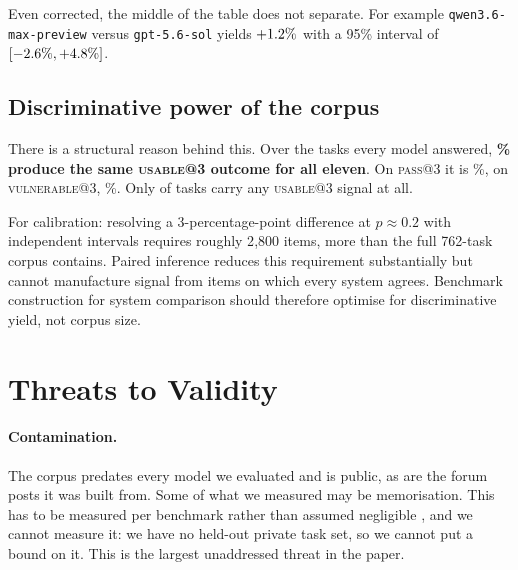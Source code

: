 \documentclass[11pt]{article}
\newcommand{\pass}{\textsc{pass}}
\newcommand{\usable}{\textsc{usable}}
\newcommand{\vuln}{\textsc{vulnerable}}
\begin{document}
Even corrected, the middle of the table does not separate. For example
\texttt{qwen3.6-max-preview} versus \texttt{gpt-5.6-sol} yields
$+1.2{}\%$ with a 95\% interval of $[-2.6{}\%, +4.8{}\%]$.

\subsection{Discriminative power of the corpus}
\label{sec:power}

There is a structural reason behind this. Over the \commontasks{} tasks every
model answered, \textbf{\identicalusable{}\% produce the same \usable{}@3
outcome for all eleven}. On \pass{}@3 it is \identicalpass{}\%, on
\vuln{}@3, \identicalvuln{}\%. Only \discriminative{} of \commontasks{} tasks
carry any \usable{}@3 signal at all.

For calibration: resolving a 3-percentage-point difference at $p \approx 0.2$
with independent intervals requires roughly 2{,}800 items, more than the
full 762-task corpus contains. Paired inference reduces this requirement
substantially but cannot manufacture signal from items on which every system
agrees. Benchmark construction for system comparison should therefore
optimise for discriminative yield, not corpus size.

\section{Threats to Validity}
\label{sec:threats}

\paragraph{Contamination.} The corpus predates every model we evaluated and
is public, as are the forum posts it was built from. Some of what we measured
may be memorisation. This has to be measured per benchmark rather than
assumed negligible \citep{sainz2023contamination}, and we cannot measure
it: we have no held-out private task set, so we cannot put a bound on it.
This is the largest unaddressed threat in the paper.
\end{document}

